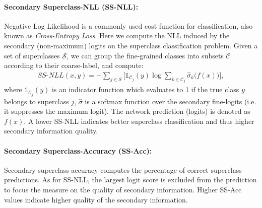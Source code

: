 \documentclass[final]{cvpr}
\begin{document}
\paragraph{Secondary Superclass-NLL (SS-NLL):}
Negative Log Likelihood is a commonly used cost function for classification, also known as \textit{Cross-Entropy Loss}.
Here we compute the NLL induced by the secondary (non-maximum) logits on the superclass classification problem. Given a set of superclasses $\mathcal{S}$, we can group the fine-grained classes into subsets $\mathcal{C}$ according to their coarse-label, and compute:
\begin{align}
    SS\text{-}NLL(x, y) = -\sum_{j\in\mathcal{S}}\bigg[\mathbb{1}_{\mathcal{C}_j}(y)\log\sum_{k\in\mathcal{C}_j} \hat{\sigma}_k\big(f(x)\big)\bigg],
\end{align}
where $\mathbb{1}_{\mathcal{C}_j}(y)$ is an indicator function which evaluates to 1 if the true class $y$ belongs to superclass $j$, $\hat{\sigma}$ is a softmax function over the secondary fine-logits (i.e. it suppresses the maximum logit). The network prediction (logits) is denoted as $f(x)$. A lower SS-NLL indicates better superclass classification and thus higher secondary information quality.
    
\paragraph{Secondary Superclass-Accuracy (SS-Acc):} Secondary superclass accuracy computes the percentage of correct superclass predictions. As for SS-NLL, the largest logit score is excluded from the prediction to focus the measure on the quality of secondary information.
Higher SS-Acc values indicate higher quality of the secondary information.
\end{document}

